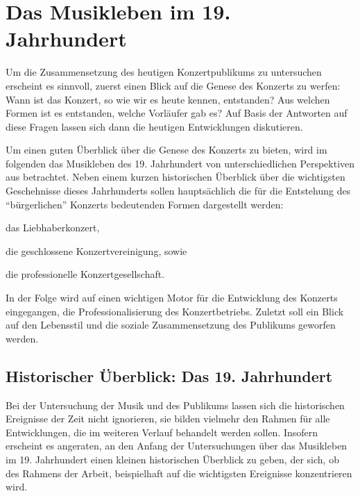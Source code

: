 \documentclass[a4paper, german, oneside]{scrbook}
\begin{document}




\chapter{Das Musikleben im 19. Jahrhundert}
\label{19jh}

Um die Zusammensetzung des heutigen Konzertpublikums zu untersuchen erscheint es sinnvoll, zuerst einen Blick auf die Genese des Konzerts zu werfen: Wann ist das Konzert, so wie wir es heute kennen, entstanden? Aus welchen Formen ist es entstanden, welche Vorläufer gab es? Auf Basis der Antworten auf diese Fragen lassen sich dann die heutigen Entwicklungen diskutieren.

Um einen guten Überblick über die Genese des Konzerts zu bieten, wird im folgenden das Musikleben des 19. Jahrhundert von unterschiedlichen Perspektiven aus betrachtet. Neben einem kurzen historischen Überblick über die wichtigsten Geschehnisse dieses Jahrhunderts sollen hauptsächlich die für die Entstehung des \enquote{bürgerlichen} Konzerts bedeutenden Formen dargestellt werden: 
\begin{inparaenum}[(1)]
	\item das Liebhaberkonzert, 
	\item die geschlossene Konzertvereinigung, sowie 
	\item die professionelle Konzertgesellschaft.
\end{inparaenum}

In der Folge wird auf einen wichtigen Motor für die Entwicklung des Konzerts eingegangen, die Professionalisierung des Konzertbetriebs. Zuletzt soll ein Blick auf den Lebensstil und die soziale Zusammensetzung des Publikums geworfen werden.


\section{Historischer Überblick: Das 19. Jahrhundert}
\label{histUberblick}
Bei der Untersuchung der Musik und des Publikums lassen sich die historischen Ereignisse der Zeit nicht ignorieren, sie bilden vielmehr den Rahmen für alle Entwicklungen, die im weiteren Verlauf behandelt werden sollen. Insofern erscheint es angeraten, an den Anfang der Untersuchungen über das Musikleben im 19. Jahrhundert einen kleinen historischen Überblick zu geben, der sich, ob des Rahmens der Arbeit, beispielhaft auf die wichtigsten Ereignisse konzentrieren wird.
\end{document}
